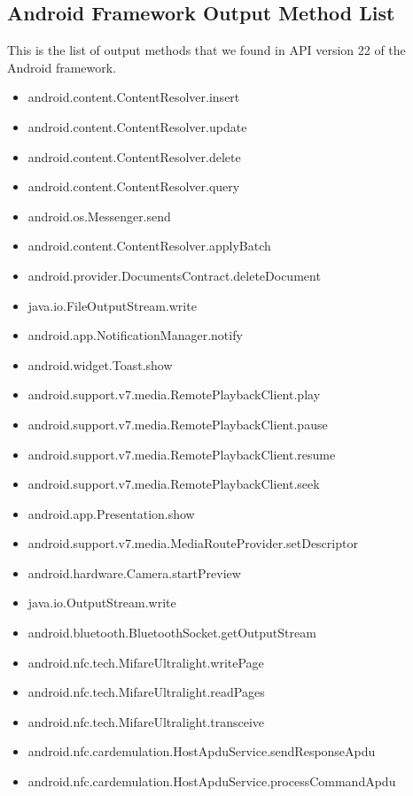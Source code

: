 \documentclass{sig-alternate}
\begin{document}
\subsection{Android Framework Output Method List}

This is the list of output methods that we found in API version 22 of the Android framework.

\begin{itemize}

\item android.content.ContentResolver.insert
\item android.content.ContentResolver.update
\item android.content.ContentResolver.delete
\item android.content.ContentResolver.query
\item android.os.Messenger.send
\item android.content.ContentResolver.applyBatch
\item android.provider.DocumentsContract.deleteDocument
\item java.io.FileOutputStream.write
\item android.app.NotificationManager.notify
\item android.widget.Toast.show
\item android.support.v7.media.RemotePlaybackClient.play
\item android.support.v7.media.RemotePlaybackClient.pause
\item android.support.v7.media.RemotePlaybackClient.resume
\item android.support.v7.media.RemotePlaybackClient.seek
\item android.app.Presentation.show
\item android.support.v7.media.MediaRouteProvider.setDescriptor
\item android.hardware.Camera.startPreview
\item java.io.OutputStream.write
\item android.bluetooth.BluetoothSocket.getOutputStream
\item android.nfc.tech.MifareUltralight.writePage
\item android.nfc.tech.MifareUltralight.readPages
\item android.nfc.tech.MifareUltralight.transceive
\item android.nfc.cardemulation.HostApduService.sendResponseApdu
\item android.nfc.cardemulation.HostApduService.processCommandApdu

\end{itemize}
\end{document}
